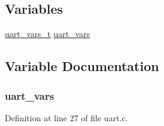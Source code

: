 \subsection*{Variables}
\begin{DoxyCompactItemize}
\item 
\hyperlink{structuart__vars__t}{uart\+\_\+vars\+\_\+t} \hyperlink{iot-lab___m3_2uart_8c_a7ad63ce38b958040884df8d8ca5da620}{uart\+\_\+vars}
\end{DoxyCompactItemize}


\subsection{Variable Documentation}
\subsubsection[{\texorpdfstring{uart\+\_\+vars}{uart_vars}}]{ uart\+\_\+vars}\hypertarget{iot-lab___m3_2uart_8c_a7ad63ce38b958040884df8d8ca5da620}{}\label{iot-lab___m3_2uart_8c_a7ad63ce38b958040884df8d8ca5da620}


Definition at line 27 of file uart.\+c.

